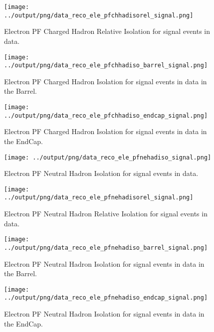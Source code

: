 \documentclass[11pt]{book}
\begin{document}
\begin{figure}[htb]
\centering
\texttt{[image: ../output/png/data\_reco\_ele\_pfchhadisorel\_signal.png]}
\caption{Electron PF Charged Hadron Relative Isolation for signal events in data.}
\label{fig:data_ele_pfchhadisorel_signal}
\end{figure}

\begin{figure}[htb]
\centering
\texttt{[image: ../output/png/data\_reco\_ele\_pfchhadiso\_barrel\_signal.png]}
\caption{Electron PF Charged Hadron Isolation for signal events in data in the Barrel.}
\label{fig:data_ele_pfchhadiso_barrel_signal}
\end{figure}

\begin{figure}[htb]
\centering
\texttt{[image: ../output/png/data\_reco\_ele\_pfchhadiso\_endcap\_signal.png]}
\caption{Electron PF Charged Hadron Isolation for signal events in data in the EndCap.}
\label{fig:data_ele_pfchhadiso_endcap_signal}
\end{figure}

\begin{figure}[htb]
\centering
\texttt{[image: ../output/png/data\_reco\_ele\_pfnehadiso\_signal.png]}
\caption{Electron PF Neutral Hadron Isolation for signal events in data.}
\label{fig:data_ele_pfnehadiso_signal}
\end{figure}

\begin{figure}[htb]
\centering
\texttt{[image: ../output/png/data\_reco\_ele\_pfnehadisorel\_signal.png]}
\caption{Electron PF Neutral Hadron Relative Isolation for signal events in data.}
\label{fig:data_ele_pfnehadisorel_signal}
\end{figure}

\begin{figure}[htb]
\centering
\texttt{[image: ../output/png/data\_reco\_ele\_pfnehadiso\_barrel\_signal.png]}
\caption{Electron PF Neutral Hadron Isolation for signal events in data in the Barrel.}
\label{fig:data_ele_pfnehadiso_barrel_signal}
\end{figure}

\begin{figure}[htb]
\centering
\texttt{[image: ../output/png/data\_reco\_ele\_pfnehadiso\_endcap\_signal.png]}
\caption{Electron PF Neutral Hadron Isolation for signal events in data in the EndCap.}
\label{fig:data_ele_pfnehadiso_endcap_signal}
\end{figure}
\end{document}
